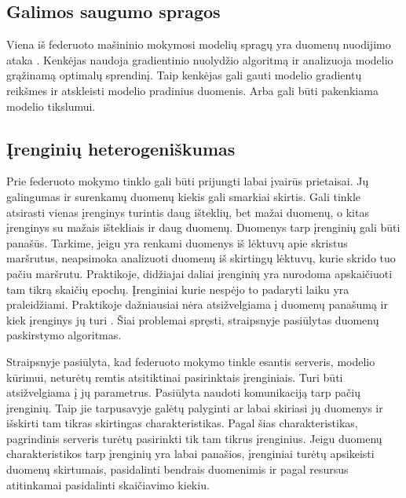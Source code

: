 \documentclass{VUMIFInfBakalaurinis}
\begin{document}
\subsection{Galimos saugumo spragos}
\par Viena iš federuoto mašininio mokymosi modelių spragų yra duomenų nuodijimo ataka \cite{19}. Kenkėjas naudoja gradientinio nuolydžio algoritmą ir analizuoja modelio grąžinamą optimalų sprendinį. Taip kenkėjas gali gauti modelio gradientų reikšmes ir atskleisti modelio pradinius duomenis. Arba gali būti pakenkiama modelio tikslumui.


\subsection{Įrenginių heterogeniškumas}
\par Prie federuoto mokymo tinklo gali būti prijungti labai įvairūs prietaisai. Jų galingumas ir surenkamų duomenų kiekis gali smarkiai skirtis. Gali tinkle atsirasti vienas įrenginys turintis daug išteklių, bet mažai duomenų, o kitas įrenginys su mažais ištekliais ir daug duomenų. Duomenys tarp įrenginių gali būti panašūs. Tarkime, jeigu yra renkami duomenys iš lėktuvų apie skristus maršrutus, neapsimoka analizuoti duomenų iš skirtingų lėktuvų, kurie skrido tuo pačiu maršrutu. Praktikoje, didžiajai daliai įrenginių yra nurodoma apskaičiuoti tam tikrą skaičių epochų. Įrenginiai kurie nespėjo to padaryti laiku yra praleidžiami. Praktikoje dažniausiai nėra atsižvelgiama į duomenų panašumą ir kiek įrenginys jų turi \cite{20}. Šiai problemai spręsti, straipsnyje \cite{21} pasiūlytas duomenų paskirstymo algoritmas. %
\par Straipsnyje \cite{20} pasiūlyta, kad federuoto mokymo tinkle esantis serveris, modelio kūrimui, neturėtų remtis atsitiktinai pasirinktais įrenginiais. Turi būti atsižvelgiama į jų parametrus. Pasiūlyta naudoti komunikaciją tarp pačių įrenginių. Taip jie tarpusavyje galėtų palyginti ar labai skiriasi jų duomenys ir išskirti tam tikras skirtingas charakteristikas. Pagal šias charakteristikas, pagrindinis serveris turėtų pasirinkti tik tam tikrus įrenginius. Jeigu duomenų charakteristikos tarp įrenginių yra labai panašios, įrenginiai turėtų apsikeisti duomenų skirtumais, pasidalinti bendrais duomenimis ir pagal resursus atitinkamai pasidalinti skaičiavimo kiekiu. 
\end{document}

